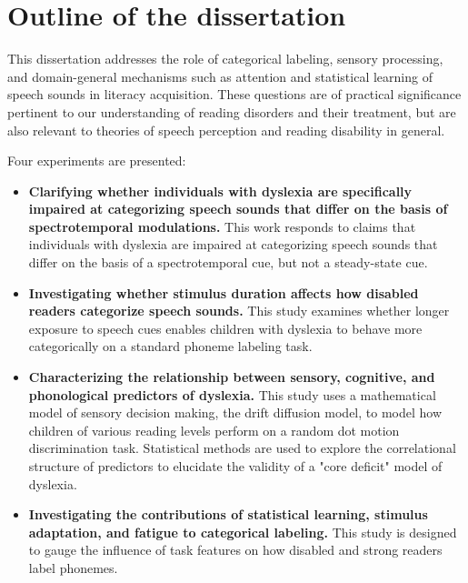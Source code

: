 \documentclass[../uwthesis.tex]{subfiles}
\begin{document}
\section{Outline of the dissertation}
This dissertation addresses the role of categorical labeling, sensory processing, and domain-general mechanisms such as attention and statistical learning of speech sounds in literacy acquisition. These questions are of practical significance pertinent to our understanding of reading disorders and their treatment, but are also relevant to theories of speech perception and reading disability in general. 

Four experiments are presented:

\begin{itemize}
    \item \textbf{Clarifying whether individuals with dyslexia are specifically impaired at categorizing speech sounds that differ on the basis of spectrotemporal modulations.}
    This work responds to claims that individuals with dyslexia are impaired at categorizing speech sounds that differ on the basis of a spectrotemporal cue, but not a steady-state cue. 
    \item \textbf{Investigating whether stimulus duration affects how disabled readers categorize speech sounds.} This study examines whether longer exposure to speech cues enables children with dyslexia to behave more categorically on a standard phoneme labeling task. 
    \item \textbf{Characterizing the relationship between sensory, cognitive, and phonological predictors of dyslexia.} This study uses a mathematical model of sensory decision making, the drift diffusion model, to model how children of various reading levels perform on a random dot motion discrimination task. Statistical methods are used to explore the correlational structure of predictors to elucidate the validity of a "core deficit" model of dyslexia. 
    \item \textbf{Investigating the contributions of statistical learning, stimulus adaptation, and fatigue to categorical labeling.} This study is designed to gauge the influence of task features on how disabled and strong readers label phonemes. 
\end{itemize}
\end{document}
